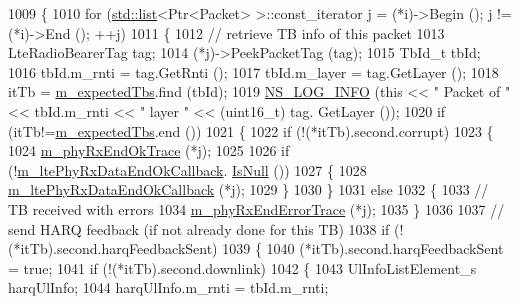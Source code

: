 \begin{DoxyCode}
1009       \{
1010         \textcolor{keywordflow}{for} (\hyperlink{openflow-interface_8h_afd9bcfa176617760671b67580f536fa7}{std::list}<Ptr<Packet> >::const\_iterator j = (*i)->Begin (); j != (*i)->End (); ++j)
1011           \{
1012             \textcolor{comment}{// retrieve TB info of this packet }
1013             LteRadioBearerTag tag;
1014             (*j)->PeekPacketTag (tag);
1015             TbId\_t tbId;
1016             tbId.m\_rnti = tag.GetRnti ();
1017             tbId.m\_layer = tag.GetLayer ();
1018             itTb = \hyperlink{classns3_1_1LteSpectrumPhy_a7ac1117604ed722833af5e5538d69251}{m\_expectedTbs}.find (tbId);
1019             \hyperlink{group__logging_gafbd73ee2cf9f26b319f49086d8e860fb}{NS\_LOG\_INFO} (\textcolor{keyword}{this} << \textcolor{stringliteral}{" Packet of "} << tbId.m\_rnti << \textcolor{stringliteral}{" layer "} <<  (uint16\_t) tag.
      GetLayer ());
1020             \textcolor{keywordflow}{if} (itTb!=\hyperlink{classns3_1_1LteSpectrumPhy_a7ac1117604ed722833af5e5538d69251}{m\_expectedTbs}.end ())
1021               \{
1022                 \textcolor{keywordflow}{if} (!(*itTb).second.corrupt)
1023                   \{
1024                     \hyperlink{classns3_1_1LteSpectrumPhy_ae9cf15930fd70025ee8d649ecb2624c6}{m\_phyRxEndOkTrace} (*j);
1025                 
1026                     \textcolor{keywordflow}{if} (!\hyperlink{classns3_1_1LteSpectrumPhy_a973340b85e53a35854a1dd1d437c669c}{m\_ltePhyRxDataEndOkCallback}.
      \hyperlink{classns3_1_1Callback_aa8e27826badbf37f84763f36f70d9b54}{IsNull} ())
1027                       \{
1028                         \hyperlink{classns3_1_1LteSpectrumPhy_a973340b85e53a35854a1dd1d437c669c}{m\_ltePhyRxDataEndOkCallback} (*j);
1029                       \}
1030                   \}
1031                 \textcolor{keywordflow}{else}
1032                   \{
1033                     \textcolor{comment}{// TB received with errors}
1034                     \hyperlink{classns3_1_1LteSpectrumPhy_ad75cd3656be0d799015b3ab4667f60e2}{m\_phyRxEndErrorTrace} (*j);
1035                   \}
1036 
1037                 \textcolor{comment}{// send HARQ feedback (if not already done for this TB)}
1038                 \textcolor{keywordflow}{if} (!(*itTb).second.harqFeedbackSent)
1039                   \{
1040                     (*itTb).second.harqFeedbackSent = \textcolor{keyword}{true};
1041                     \textcolor{keywordflow}{if} (!(*itTb).second.downlink)
1042                       \{
1043                         UlInfoListElement\_s harqUlInfo;
1044                         harqUlInfo.m\_rnti = tbId.m\_rnti;

\end{DoxyCode}
